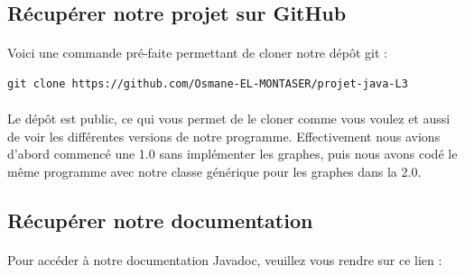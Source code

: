 \documentclass[12pt]{article}
\begin{document}
\subsection{Récupérer notre projet sur GitHub}
\paragraph{} Voici une commande pré-faite permettant de cloner notre dépôt git :
\begin{lstlisting}[style=BashStyle]
git clone https://github.com/Osmane-EL-MONTASER/projet-java-L3
\end{lstlisting}
\paragraph{} Le dépôt est public, ce qui vous permet de le cloner comme vous voulez et aussi de voir les différentes versions de notre programme.
Effectivement nous avions d'abord commencé une 1.0 sans implémenter les graphes, puis nous avons codé le même programme avec notre classe générique pour les graphes dans la 2.0.
\subsection{Récupérer notre documentation}
\paragraph{} Pour accéder à notre documentation Javadoc, veuillez vous rendre sur ce lien :
\end{document}
